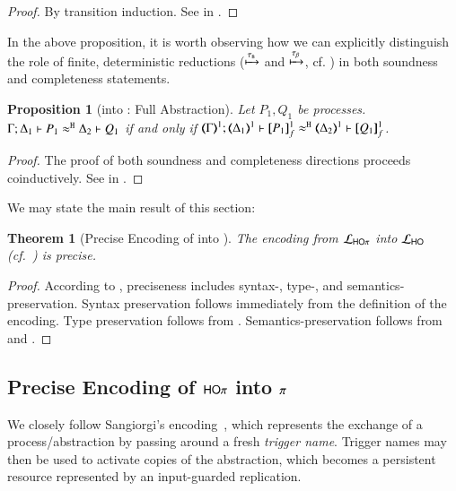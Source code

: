 \documentclass[preprint,11pt]{elsarticle}
\newtheorem{proposition}{Proposition}[section]
\newtheorem{theorem}{Theorem}[section]
\begin{document}
{{\begin{proof}
By transition induction. See  in .
\end{proof}

In the above proposition, it is worth
observing how we can explicitly distinguish the role of finite, deterministic reductions 
($\xmapsto{\tau_{\mathsf{s}}}$ and $\xmapsto{\tau_{\beta}}$, cf. ) in both soundness and completeness statements.

\begin{proposition}[\HOp into \HO: Full Abstraction]%
	\label{prop:fulla_HOp_to_HO}
	Let $P_1, Q_1$ be \HOp processes. \\
	$\Gamma; \Delta_1 \vdash P_1 \approx^\mathtt{H} \Delta_2 \vdash Q_1$
	if and only if
	$\horel{\tmap{\Gamma}{1}}{\tmap{\Delta_1}{1}}{\pmapp{P_1}{1}{f}}{\hwb}{\tmap{\Delta_2}{1}}{\pmapp{Q_1}{1}{f}}$.
\end{proposition}

\begin{proof}
The proof of both soundness and completeness directions proceeds coinductively.
See  in .
\end{proof}


We may state the main result of this section: %

\begin{theorem}[Precise Encoding of \HOp into \HO]
\label{f:enc:hopitoho}
The encoding from $\mathcal{L}_{\mathsf{HO}\pi}$ into $\mathcal{L}_{\mathsf{HO}}$ (cf.~)
is precise. 
\end{theorem}

\begin{proof}
According to , preciseness includes syntax-, type-, and semantics-preservation. 
Syntax preservation follows immediately from the definition of the encoding. 
Type preservation follows from .
Semantics-preservation follows from 	 and .
\end{proof}

\subsection{Precise Encoding of $\mathsf{HO}\pi$ into $\pi$}
\label{subsec:HOp_to_sessp}
We closely follow Sangiorgi's encoding~\cite{San92,SaWabook}, which represents 
the exchange of a process/abstraction by passing around a fresh \emph{trigger name}. 
Trigger names may then be used to activate copies of the abstraction, which becomes a persistent resource represented by an input-guarded replication.

}}
\end{document}
